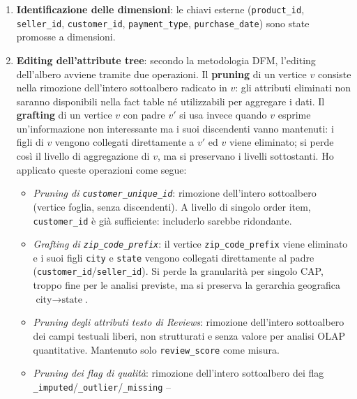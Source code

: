 \documentclass[12pt,a4paper]{article}
\begin{document}
\begin{enumerate}
  \item \textbf{Identificazione delle dimensioni}: le chiavi esterne
        (\texttt{product\_id}, \texttt{seller\_id}, \texttt{customer\_id},
        \texttt{payment\_type}, \texttt{purchase\_date}) sono state promosse a
        dimensioni.

  \item \textbf{Editing dell'attribute tree}: secondo la metodologia DFM, l'editing
        dell'albero avviene tramite due operazioni. Il \textbf{pruning} di un vertice
        $v$ consiste nella rimozione dell'intero sottoalbero radicato in $v$: gli
        attributi eliminati non saranno disponibili nella fact table né utilizzabili
        per aggregare i dati. Il \textbf{grafting} di un vertice $v$ con padre $v'$ si
        usa invece quando $v$ esprime un'informazione non interessante ma i suoi
        discendenti vanno mantenuti: i figli di $v$ vengono collegati direttamente a
        $v'$ ed $v$ viene eliminato; si perde così il livello di aggregazione di $v$,
        ma si preservano i livelli sottostanti. Ho applicato queste operazioni come
        segue:
        \begin{itemize}
        \sloppy
          \item \textit{Pruning di \texttt{customer\_unique\_id}}: rimozione
                dell'intero sottoalbero (vertice foglia, senza discendenti). A livello
                di singolo order item, \texttt{customer\_id} è già sufficiente:
                includerlo sarebbe ridondante.
          \item \textit{Grafting di \texttt{zip\_code\_prefix}}: il vertice
                \texttt{zip\_code\_prefix} viene eliminato e i suoi figli
                \texttt{city} e \texttt{state} vengono collegati direttamente al
                padre (\texttt{customer\_id}/\texttt{seller\_id}). Si perde la
                granularità per singolo CAP, troppo fine per le analisi previste, ma
                si preserva la gerarchia geografica $\text{city} \to \text{state}$.
          \item \textit{Pruning degli attributi testo di Reviews}: rimozione
                dell'intero sottoalbero dei campi testuali liberi, non strutturati e
                senza valore per analisi OLAP quantitative. Mantenuto solo
                \texttt{review\_score} come misura.
          \item \textit{Pruning dei flag di qualità}: rimozione dell'intero sottoalbero
                dei flag \texttt{\_imputed}/\texttt{\_outlier}/\texttt{\_missing} --

\end{itemize}
\end{enumerate}
\end{document}
